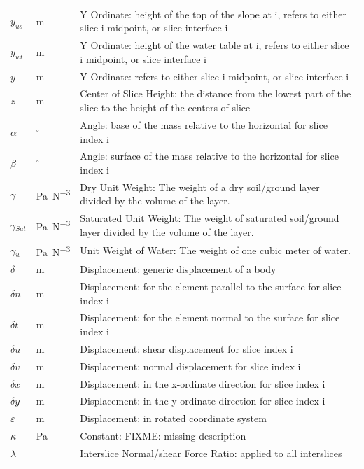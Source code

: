 \documentclass[12pt]{article}
\begin{document}
\begin{longtable}{  l  l  p{8.5cm}  }
${y_{us}}$ &  \si{\meter}&Y Ordinate: height of the top of the slope at i, refers to either slice i midpoint, or slice interface i 
\\
${y_{wt}}$ &  \si{\meter}&Y Ordinate: height of the water table at i, refers to either slice i midpoint, or slice interface i 
\\
$y$ &  \si{\meter}&Y Ordinate: refers to either slice i midpoint, or slice interface i 
\\
$z$ & \si{\meter}& Center of Slice Height: the distance from the lowest part of the slice to the height of the centers of slice
\\
$\alpha{}$ & ${}^{\circ}$ &Angle: base of the mass relative to the horizontal for slice index i
\\
$\beta{}$ &${}^{\circ}$ & Angle: surface of the mass relative to the horizontal for slice index i
\\
$\gamma{}$ & \si{\pascal\per\cubic\newton} &Dry Unit Weight: The weight of a dry soil/ground layer divided by the volume of the layer.
\\
${\gamma{}_{Sat}}$ &  \si{\pascal\per\cubic\newton} &Saturated Unit Weight: The weight of saturated soil/ground layer divided by the volume of the layer.
\\
${\gamma{}_{w}}$ & \si{\pascal\per\cubic\newton} & Unit Weight of Water: The weight of one cubic meter of water.
\\
$\delta{}$ & \si{\meter}& Displacement: generic displacement of a body 
\\
$\delta{}n$ & \si{\meter}& Displacement: for the element parallel to the surface for slice index i
\\
$\delta{}t$ &  \si{\meter}&Displacement: for the element normal to the surface for slice index i 
\\
$\delta{}u$ &  \si{\meter}&Displacement: shear displacement for slice index i 
\\
$\delta{}v$ & \si{\meter}& Displacement: normal displacement for slice index i 
\\
$\delta{}x$ &  \si{\meter}& Displacement: in the x-ordinate direction for slice index i 
\\
$\delta{}y$ &  \si{\meter}& Displacement: in the y-ordinate direction for slice index i 
\\
$\varepsilon{}$ & \si{\meter}& Displacement: in rotated coordinate system
\\
$\kappa{}$ &\si{\pascal} & Constant: FIXME: missing description
\\
$\lambda{}$ & & Interslice Normal/shear Force Ratio: applied to all interslices

\end{longtable}
\end{document}
